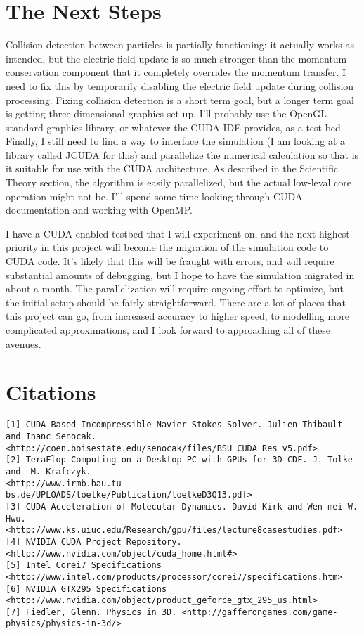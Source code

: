 \documentclass[10pt]{article}
\begin{document}
\section{The Next Steps}
Collision detection between particles is partially functioning: it actually works as intended, but the electric field update is so much stronger than the momentum conservation component that it completely overrides the momentum transfer. I need to fix this by temporarily disabling the electric field update during collision processing. Fixing collision detection is a short term goal, but a longer term goal is getting three dimensional graphics set up. I'll probably use the OpenGL standard graphics library, or whatever the CUDA IDE provides, as a test bed. Finally, I still need to find a way to interface the simulation (I am looking at a library called JCUDA for this) and parallelize the numerical calculation so that is it suitable for use with the CUDA architecture. As described in the Scientific Theory section, the algorithm is easily parallelized, but the actual low-leval core operation might not be. I'll spend some time looking through CUDA documentation and working with OpenMP. 

I have a CUDA-enabled testbed that I will experiment on, and the next highest priority in this project will become the migration of the simulation code to CUDA code. It's likely that this will be fraught with errors, and will require substantial amounts of debugging, but I hope to have the simulation migrated in about a month. The parallelization will require ongoing effort to optimize, but the initial setup should be fairly straightforward. There are a lot of places that this project can go, from increased accuracy to higher speed, to modelling more complicated approximations, and I look forward to approaching all of these avenues.


\section{Citations}


\begin{verbatim}
[1] CUDA-Based Incompressible Navier-Stokes Solver. Julien Thibault and Inanc Senocak.
<http://coen.boisestate.edu/senocak/files/BSU_CUDA_Res_v5.pdf>
[2] TeraFlop Computing on a Desktop PC with GPUs for 3D CDF. J. Tolke and  M. Krafczyk.  
<http://www.irmb.bau.tu-bs.de/UPLOADS/toelke/Publication/toelkeD3Q13.pdf>
[3] CUDA Acceleration of Molecular Dynamics. David Kirk and Wen-mei W. Hwu.  
<http://www.ks.uiuc.edu/Research/gpu/files/lecture8casestudies.pdf>
[4] NVIDIA CUDA Project Repository. <http://www.nvidia.com/object/cuda_home.html#>
[5] Intel Corei7 Specifications <http://www.intel.com/products/processor/corei7/specifications.htm>
[6] NVIDIA GTX295 Specifications <http://www.nvidia.com/object/product_geforce_gtx_295_us.html>
[7] Fiedler, Glenn. Physics in 3D. <http://gafferongames.com/game-physics/physics-in-3d/>
\end{verbatim}
\end{document}
